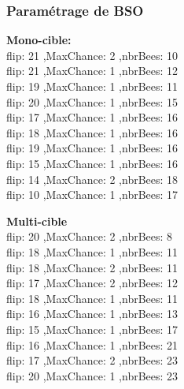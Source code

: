 \subsubsection{Paramétrage de BSO}
\noindent
\begin{minipage}[t]{0.55\textwidth}
	\textbf{Mono-cible:} \\
	flip: 21 ,MaxChance: 2 ,nbrBees: 10\\
	flip: 21 ,MaxChance: 1 ,nbrBees: 12\\
	flip: 19 ,MaxChance: 1 ,nbrBees: 11\\
	flip: 20 ,MaxChance: 1 ,nbrBees: 15\\
	flip: 17 ,MaxChance: 1 ,nbrBees: 16\\
	flip: 18 ,MaxChance: 1 ,nbrBees: 16\\
	flip: 19 ,MaxChance: 1 ,nbrBees: 16\\
	flip: 15 ,MaxChance: 1 ,nbrBees: 16\\
	flip: 14 ,MaxChance: 2 ,nbrBees: 18\\
	flip: 10 ,MaxChance: 1 ,nbrBees: 17\\
	
	
\end{minipage}\hfill
\hspace{0.2cm}
\begin{minipage}[t]{0.55\textwidth}
	\textbf{Multi-cible}\\
	flip: 20 ,MaxChance: 2 ,nbrBees: 8\\
	flip: 18 ,MaxChance: 1 ,nbrBees: 11\\
	flip: 18 ,MaxChance: 2 ,nbrBees: 11\\
	flip: 17 ,MaxChance: 2 ,nbrBees: 12\\
	flip: 18 ,MaxChance: 1 ,nbrBees: 11\\
	flip: 16 ,MaxChance: 1 ,nbrBees: 13\\
	flip: 15 ,MaxChance: 1 ,nbrBees: 17\\
	flip: 16 ,MaxChance: 1 ,nbrBees: 21\\
	flip: 17 ,MaxChance: 2 ,nbrBees: 23\\
	flip: 20 ,MaxChance: 1 ,nbrBees: 23\\
	
\end{minipage}\hfill



